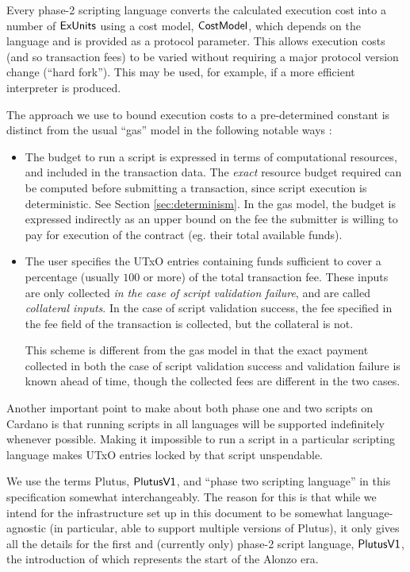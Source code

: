 Every phase-2 scripting language
converts the calculated execution cost into a number of $\mathsf{ExUnits}$ using a cost model,
$\mathsf{CostModel}$, which depends on the language and is provided as a protocol parameter.
This allows execution costs (and so transaction fees) to be varied without requiring a major protocol version change (``hard fork'').
This may be used, for example, if a more efficient interpreter is produced.

The approach we use to bound execution costs to a pre-determined constant is
distinct from the usual ``gas'' model in the following notable ways :

\begin{itemize}
  \item The budget to run a script is expressed in terms of computational resources,
  and included in the transaction data. The \emph{exact} resource budget required can
  be computed before submitting a transaction, since script execution is deterministic.
  See Section \ref{sec:determinism}.
  In the gas model, the budget is expressed indirectly as an upper bound
  on the fee the submitter is willing to pay for execution of the
  contract (eg. their total available funds).

  \item The user specifies the UTxO entries containing funds sufficient to cover a percentage
  (usually $100$ or more) of the total transaction fee.
  These inputs are only collected \emph{in the case of script validation failure},
  and are called \emph{collateral inputs}. In the case of
  script validation success, the fee specified in the fee field of the transaction is collected,
  but the collateral is not.

  This scheme is different from the gas model in that the exact payment collected in
  both the case of script validation success and validation failure is known ahead of time,
  though the collected fees are different in the two cases.
\end{itemize}

Another important point to make about both phase one and two scripts on Cardano is that
running scripts in all languages will be supported indefinitely whenever possible.
Making it impossible to run a script in a particular scripting language
makes UTxO entries locked by that script unspendable.

We use the terms Plutus, $\mathsf{PlutusV1}$, and ``phase two scripting language'' in this specification
somewhat interchangeably. The reason for this is that while we intend for the infrastructure
set up in this document to be somewhat language-agnostic (in particular,
able to support multiple versions of Plutus), it only gives all the details for
the first and (currently only) phase-2 script language, $\mathsf{PlutusV1}$,
the introduction of which represents the
start of the Alonzo era.


